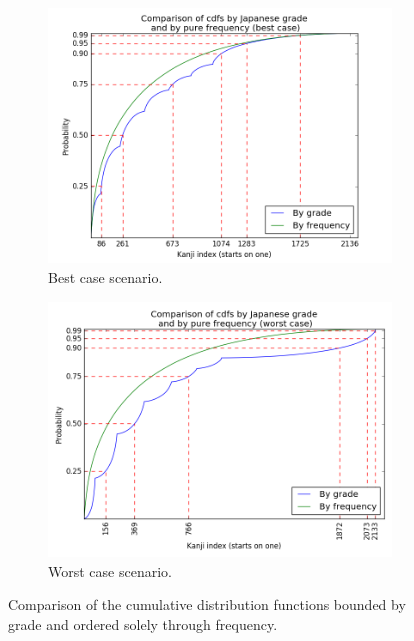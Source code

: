 \begin{figure}[ht]
    \centering
    \begin{subfigure}{0.9\textwidth}
    \centering
    \includegraphics[width=\linewidth]{Cap2/CDFVersusGrade}
    \caption{Best case scenario.}
    \label{fig:cdfcomparisonbest}
    \end{subfigure}
    \begin{subfigure}{0.9\textwidth}
    \centering
    \includegraphics[width=\linewidth]{Cap2/CDFVersusGradeWorst}
    \caption{Worst case scenario.}
    \label{fig:cdfcomparisonworst}
    \end{subfigure}
    
    \caption{Comparison of the cumulative distribution functions bounded by grade and ordered solely through frequency.}
    \label{fig:cdfcomparison}
\end{figure}

